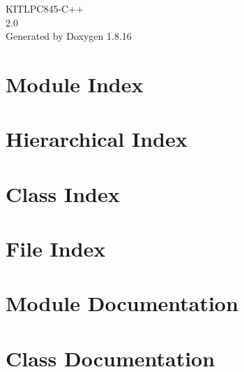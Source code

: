 \let\mypdfximage\pdfximage\def\pdfximage{\immediate\mypdfximage}\documentclass[twoside]{book}
\newcommand{\+}{\discretionary{\mbox{\scriptsize$\hookleftarrow$}}{}{}}
\newcommand{\clearemptydoublepage}{%
  \newpage{\pagestyle{empty}\cleardoublepage}%
}
\begin{document}
\hypersetup{pageanchor=false,
             bookmarksnumbered=true,
             pdfencoding=unicode
            }
\begin{titlepage}
\vspace*{7cm}
\begin{center}%
{\Large K\+I\+T\+L\+P\+C845-\/\+C++ \\[1ex]\large 2.\+0 }\\
\vspace*{1cm}
{\large Generated by Doxygen 1.8.16}\\
\end{center}
\end{titlepage}
\clearemptydoublepage
{}
\tableofcontents
\clearemptydoublepage
{}
\hypersetup{pageanchor=true}

\chapter{Module Index}

\chapter{Hierarchical Index}

\chapter{Class Index}

\chapter{File Index}

\chapter{Module Documentation}


\chapter{Class Documentation}






































\end{document}
